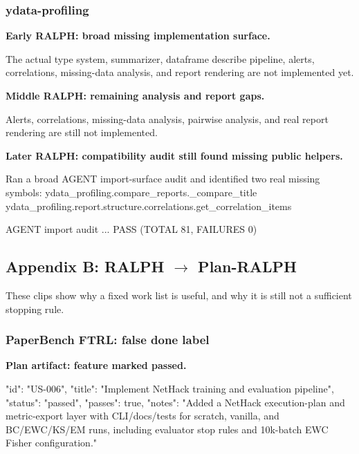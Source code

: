 \documentclass[11pt,a4paper]{article}
\begin{document}
\subsubsection{ydata-profiling}

\textbf{Early RALPH: broad missing implementation surface.}

\begin{cbox}
The actual type system, summarizer, dataframe describe pipeline, alerts,
correlations, missing-data analysis, and report rendering are not implemented yet.
\end{cbox}

\textbf{Middle RALPH: remaining analysis and report gaps.}

\begin{cbox}
Alerts, correlations, missing-data analysis, pairwise analysis,
and real report rendering are still not implemented.
\end{cbox}

\textbf{Later RALPH: compatibility audit still found missing public helpers.}

\begin{cbox}
Ran a broad AGENT import-surface audit and identified two real missing symbols:
ydata_profiling.compare_reports._compare_title
ydata_profiling.report.structure.correlations.get_correlation_items

AGENT import audit ... PASS (TOTAL 81, FAILURES 0)
\end{cbox}

\subsection{Appendix B: RALPH $\rightarrow$ Plan-RALPH}

These clips show why a fixed work list is useful, and why it is still not a sufficient stopping rule.

\subsubsection{PaperBench FTRL: false done label}

\textbf{Plan artifact: feature marked passed.}

\begin{cbox}
{
  "id": "US-006",
  "title": "Implement NetHack training and evaluation pipeline",
  "status": "passed",
  "passes": true,
  "notes": "Added a NetHack execution-plan and metric-export layer with CLI/docs/tests for scratch, vanilla, and BC/EWC/KS/EM runs, including evaluator stop rules and 10k-batch EWC Fisher configuration."
}
\end{cbox}
\end{document}
